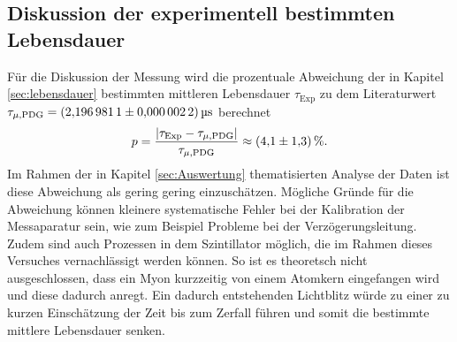 \subsection*{Diskussion der experimentell bestimmten Lebensdauer}
Für die Diskussion der Messung wird die prozentuale Abweichung der in Kapitel \ref{sec:lebensdauer} bestimmten mittleren Lebensdauer $\tau_\text{Exp}$ 
zu dem Literaturwert $\tau_{\mu,\text{PDG}}=\SI{2.1969811 \pm0.0000022}{\micro\second}$ \cite{PDG} berechnet
\begin{equation*}
    p=\frac{|\tau_\text{Exp}-\tau_{\mu,\text{PDG}}|}{\tau_{\mu,\text{PDG}}}\approx \SI{4.1\pm1.3}{\percent}.
\end{equation*}
Im Rahmen der in Kapitel \ref{sec:Auswertung} thematisierten Analyse der Daten ist diese Abweichung als gering gering einzuschätzen. Mögliche Gründe für die Abweichung 
können kleinere systematische Fehler bei der Kalibration der Messaparatur sein, wie zum Beispiel Probleme bei der Verzögerungsleitung. Zudem sind auch Prozessen in dem
Szintillator möglich, die im Rahmen dieses Versuches vernachlässigt werden können. So ist es theoretsch nicht ausgeschlossen, dass ein Myon kurzzeitig von einem Atomkern 
eingefangen wird und diese dadurch anregt. Ein dadurch entstehenden Lichtblitz würde zu einer zu kurzen Einschätzung der Zeit bis zum Zerfall führen und somit die 
bestimmte mittlere Lebensdauer senken.